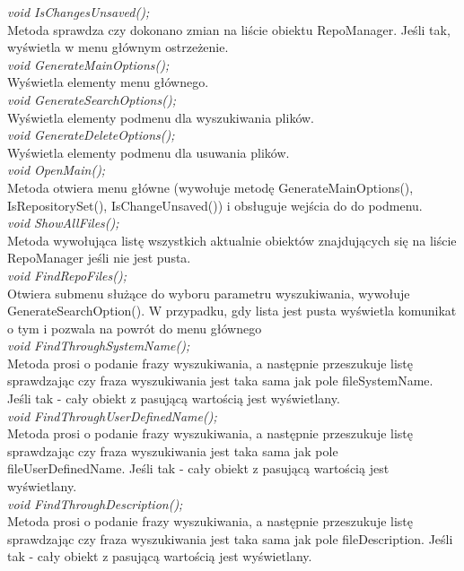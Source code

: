 \documentclass[10pt, a4paper]{article}
\begin{document}
\textit{void IsChangesUnsaved();}\\
Metoda sprawdza czy dokonano zmian na liście obiektu RepoManager. Jeśli tak, wyświetla w menu głównym ostrzeżenie.\\

\textit{void GenerateMainOptions();}\\
Wyświetla elementy menu głównego.\\

\textit{void GenerateSearchOptions();}\\
Wyświetla elementy podmenu dla wyszukiwania plików.\\

\textit{void GenerateDeleteOptions();}\\
Wyświetla elementy podmenu dla usuwania plików.\\

\textit{void OpenMain();}\\
Metoda otwiera menu główne (wywołuje metodę GenerateMainOptions(), IsRepositorySet(), IsChangeUnsaved()) i obsługuje wejścia do do podmenu.\\

\textit{void ShowAllFiles();}\\
Metoda wywołująca listę wszystkich aktualnie obiektów znajdujących się na liście RepoManager jeśli nie jest pusta.\\

\textit{void FindRepoFiles();}\\
Otwiera submenu służące do wyboru parametru wyszukiwania, wywołuje GenerateSearchOption(). W przypadku, gdy lista jest pusta wyświetla komunikat o tym i pozwala na powrót do menu głównego\\

\textit{void FindThroughSystemName();}\\
Metoda prosi o podanie frazy wyszukiwania, a następnie przeszukuje listę sprawdzając czy fraza wyszukiwania jest taka sama jak pole fileSystemName. Jeśli tak - cały obiekt z pasującą wartością jest wyświetlany.\\

\textit{void FindThroughUserDefinedName();}\\
Metoda prosi o podanie frazy wyszukiwania, a następnie przeszukuje listę sprawdzając czy fraza wyszukiwania jest taka sama jak pole fileUserDefinedName. Jeśli tak - cały obiekt z pasującą wartością jest wyświetlany.\\

\textit{void FindThroughDescription();}\\
Metoda prosi o podanie frazy wyszukiwania, a następnie przeszukuje listę sprawdzając czy fraza wyszukiwania jest taka sama jak pole fileDescription. Jeśli tak - cały obiekt z pasującą wartością jest wyświetlany.\\
\end{document}
